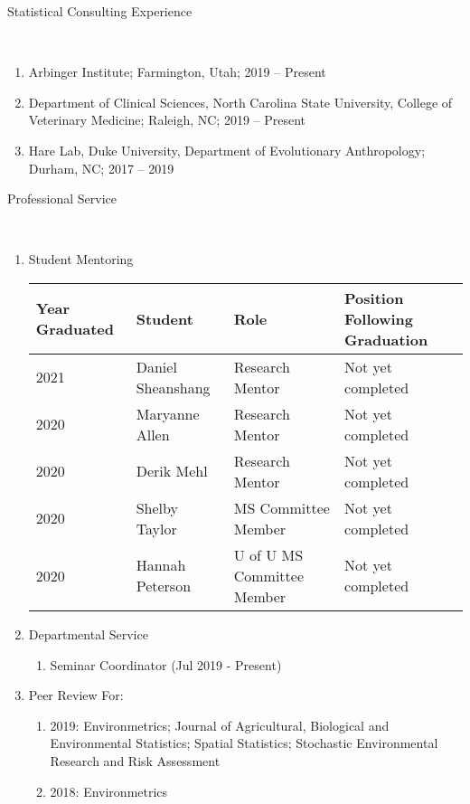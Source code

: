 \documentclass[11pt]{article}
\newcommand{\head}[1]{ %
    \bigskip %
    \begin{large}\begin{bf}{#1}\end{bf}\end{large} %

    \ \\ [-1.3cm] %

    \hrulefill}
\begin{document}
\head{Statistical Consulting Experience}

\begin{enumerate}[label=$\bullet$]

\item Arbinger Institute; Farmington, Utah; 2019 -- Present

\item Department of Clinical Sciences, North Carolina State University, College of Veterinary Medicine; Raleigh, NC; 2019 -- Present

\item Hare Lab, Duke University, Department of Evolutionary Anthropology; Durham, NC; 2017 -- 2019

\end{enumerate}



\head{Professional Service}
\begin{enumerate}[label=$\bullet$]

\item Student Mentoring

\begin{table}[H]
\centering
\begin{tabular}{llll}
  \hline
Year Graduated & Student & Role & Position Following Graduation \\ 
  \hline
  2021  & Daniel Sheanshang & Research Mentor & Not yet completed \\ 
2020  & Maryanne Allen & Research Mentor & Not yet completed \\ 
2020  & Derik Mehl & Research Mentor & Not yet completed  \\ 
2020  & Shelby Taylor & MS Committee Member & Not yet completed  \\ 
2020  & Hannah Peterson & U of U MS Committee Member & Not yet completed  \\ 
   \hline
\end{tabular}
\end{table}

\item Departmental Service
\begin{enumerate}[label=$\cdot$]
\item Seminar Coordinator (Jul 2019 - Present)
\end{enumerate}

\item Peer Review For:
\begin{enumerate}[label=$\cdot$]
\item 2019: Environmetrics; Journal of Agricultural, Biological and Environmental Statistics; Spatial Statistics; Stochastic Environmental Research and Risk Assessment 
\item 2018: Environmetrics 
\end{enumerate}
\end{enumerate}
\end{document}
